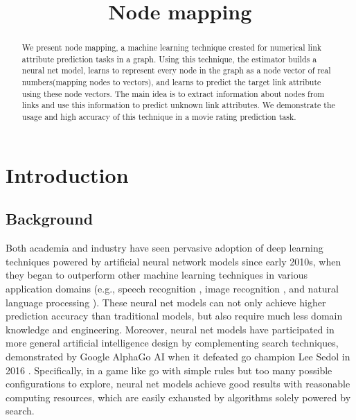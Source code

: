\documentclass{article}
\begin{document}
\lstset{language=python, tabsize=4}
\title{Node mapping}
\maketitle

\begin{abstract}
	We present node mapping, a machine learning technique created for numerical 
	link attribute prediction tasks in a graph.
	Using this technique, the estimator builds a neural net model, learns to 
	represent every node in the graph as a node vector of real numbers(mapping 
	nodes to vectors), and learns to predict the target link attribute using 
	these node vectors.
	The main idea is to extract information about nodes from links and use this 
	information to predict unknown link attributes.
	We demonstrate the usage and high accuracy of this technique in a movie 
	rating prediction task.
\end{abstract}

\section{Introduction}

\subsection{Background}
Both academia and industry have seen pervasive adoption of deep learning 
techniques powered by artificial neural network models since early 2010s, when 
they began to outperform other machine learning techniques in various 
application domains (e.g., speech recognition \cite{hannun2014deep}, image 
recognition \cite{simonyan2014very}, and natural language processing 
\cite{yao2013recurrent}).
These neural net models can not only achieve higher prediction accuracy than 
traditional models, but also require much less domain knowledge and engineering.
Moreover, neural net models have participated in more general artificial 
intelligence design by complementing search techniques, demonstrated by
Google AlphaGo AI when it defeated go champion Lee Sedol in 2016 
\cite{silver2016mastering}.
Specifically, in a game like go with simple rules but too many possible 
configurations to explore, neural net models achieve good results with 
reasonable computing resources, which are easily exhausted by algorithms solely 
powered by search.
\end{document}
